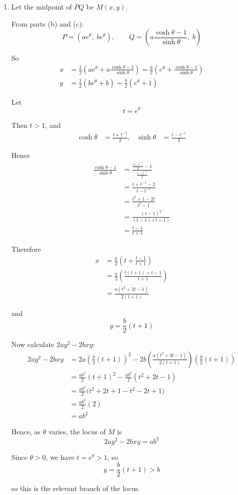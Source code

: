 \documentclass[leqno]{article}
\begin{document}
\begin{enumerate}[
  label=\textbf{\arabic*.},
  leftmargin=*,
  topsep=0pt,
  partopsep=0pt,
  parsep=0pt
]
\begin{djsSolution}
\begin{enumerate}[label=\textbf{(\alph*)}]
  \item Let the midpoint of $PQ$ be $M(x,y)$.

From parts (b) and (c):
\[
P=(ae^\theta,\;be^\theta),\qquad
Q=\left(a\frac{\cosh\theta-1}{\sinh\theta},\;b\right)
\]

So
\begin{align*}
x&=\frac{1}{2}\left(ae^\theta+a\frac{\cosh\theta-1}{\sinh\theta}\right)
=\frac{a}{2}\left(e^\theta+\frac{\cosh\theta-1}{\sinh\theta}\right)\\
y&=\frac{1}{2}(be^\theta+b)=\frac{b}{2}(e^\theta+1)
\end{align*}

Let
\[
t=e^\theta
\]

Then $t>1$, and
\begin{align*}
\cosh\theta&=\frac{t+t^{-1}}{2},&
\sinh\theta&=\frac{t-t^{-1}}{2}
\end{align*}

Hence
\begin{align*}
\frac{\cosh\theta-1}{\sinh\theta}
&=\frac{\frac{t+t^{-1}}{2}-1}{\frac{t-t^{-1}}{2}}\\
&=\frac{t+t^{-1}-2}{t-t^{-1}}\\
&=\frac{t^2+1-2t}{t^2-1}\\
&=\frac{(t-1)^2}{(t-1)(t+1)}\\
&=\frac{t-1}{t+1}
\end{align*}

Therefore
\begin{align*}
x&=\frac{a}{2}\left(t+\frac{t-1}{t+1}\right)\\
&=\frac{a}{2}\left(\frac{t(t+1)+t-1}{t+1}\right)\\
&=\frac{a(t^2+2t-1)}{2(t+1)}
\end{align*}

and
\[
y=\frac{b}{2}(t+1)
\]

Now calculate $2ay^2-2bxy$:
\begin{align*}
2ay^2-2bxy
&=2a\left(\frac{b}{2}(t+1)\right)^2
-2b\left(\frac{a(t^2+2t-1)}{2(t+1)}\right)\left(\frac{b}{2}(t+1)\right)\\
&=\frac{ab^2}{2}(t+1)^2-\frac{ab^2}{2}(t^2+2t-1)\\
&=\frac{ab^2}{2}\bigl(t^2+2t+1-t^2-2t+1\bigr)\\
&=\frac{ab^2}{2}(2)\\
&=ab^2
\end{align*}

Hence, as $\theta$ varies, the locus of $M$ is
\[
2ay^2-2bxy=ab^2
\]

Since $\theta>0$, we have $t=e^\theta>1$, so
\[
y=\frac{b}{2}(t+1)>b
\]

so this is the relevant branch of the locus.
\end{enumerate}
\end{djsSolution}


\end{enumerate}
\end{document}
